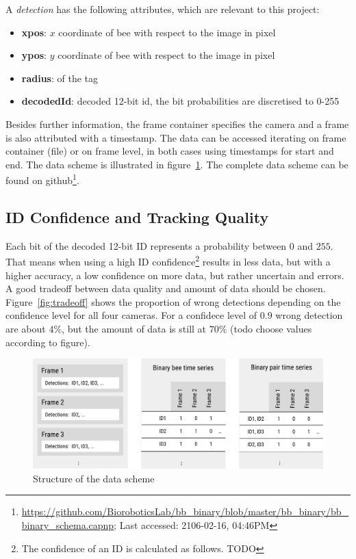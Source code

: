 A \emph{detection} has the following attributes, which are relevant to this project:

\begin{itemize}
\item \textbf{xpos}: $x$ coordinate of bee with respect to the image in pixel
\item \textbf{ypos}: $y$ coordinate of bee with respect to the image in pixel
\item \textbf{radius}: of the tag
\item \textbf{decodedId}: decoded 12-bit id, the bit probabilities are discretised to 0-255
\end{itemize}

Besides further information, the frame container specifies the camera and a frame is also attributed with a timestamp. The data can be accessed iterating on frame container (file) or on frame level, in both cases using timestamps for start and end. The data scheme is illustrated in figure~\ref{fig:scheme}.
The complete data scheme can be found on github\footnote{\url{https://github.com/BioroboticsLab/bb_binary/blob/master/bb_binary/bb_binary_schema.capnp}; Last accessed: 2106-02-16, 04:46PM}. 


\subsection{ID Confidence and Tracking Quality}
Each bit of the decoded 12-bit ID represents a probability between $0$ and $255$. That means when using a high ID confidence\footnote{The confidence of an ID is calculated as follows. TODO} results in less data, but with a higher accuracy, a low confidence on more data, but rather uncertain and errors. A good tradeoff between data quality and amount of data should be chosen. Figure~\ref{fig:tradeoff} shows the proportion of wrong detections depending on the confidence level for all four cameras. For a confidece level of $0.9$ wrong detection are about $4\%$, but the amount of data is still at $70\%$ (todo choose values according to figure).

\begin{figure}[htb]
	\centering
	\includegraphics[width=1.0\textwidth]{Figures/structure}
	\caption{Structure of the data scheme}
	\label{fig:scheme}
\end{figure}

